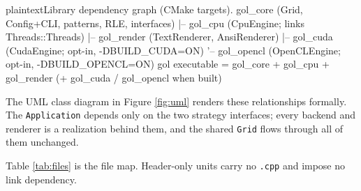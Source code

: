 \documentclass[
	english,
	letterpaper, oneside
]{article}
\begin{document}
\begin{sourcecode}{plaintext}{Library dependency graph (CMake targets).}
gol_core  (Grid, Config+CLI, patterns, RLE, interfaces)
   |-- gol_cpu     (CpuEngine; links Threads::Threads)
   |-- gol_render  (TextRenderer, AnsiRenderer)
   |-- gol_cuda    (CudaEngine; opt-in, -DBUILD_CUDA=ON)
   '-- gol_opencl  (OpenCLEngine; opt-in, -DBUILD_OPENCL=ON)
gol  executable  =  gol_core + gol_cpu + gol_render (+ gol_cuda / gol_opencl when built)
\end{sourcecode}

The UML class diagram in Figure \ref{fig:uml} renders these relationships
formally. The \texttt{Application} depends only on the two strategy interfaces;
every backend and renderer is a realization behind them, and the shared
\texttt{Grid} flows through all of them unchanged.


Table \ref{tab:files} is the file map. Header-only units carry no \texttt{.cpp}
and impose no link dependency.
\end{document}
